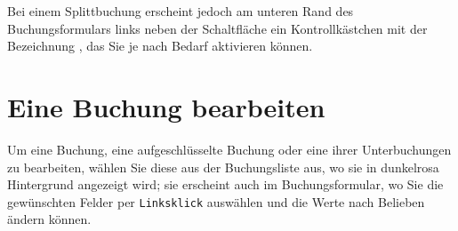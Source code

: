 Bei einem Splittbuchung erscheint jedoch am unteren Rand des Buchungsformulars links neben der Schaltfläche  ein Kontrollkästchen mit der Bezeichnung , das Sie je nach Bedarf aktivieren können.


\section{Eine Buchung bearbeiten\label{transactions-modify}}

Um eine Buchung, eine aufgeschlüsselte Buchung oder eine ihrer Unterbuchungen zu bearbeiten, wählen Sie diese aus der Buchungsliste aus, wo sie in {\setlength{\fboxsep}{2pt}\colorbox[RGB]{245,155,155}{dunkelrosa Hintergrund}} angezeigt wird; sie erscheint auch im Buchungsformular, wo Sie die gewünschten Felder per \texttt{Linksklick} auswählen und die Werte nach Belieben ändern können.

